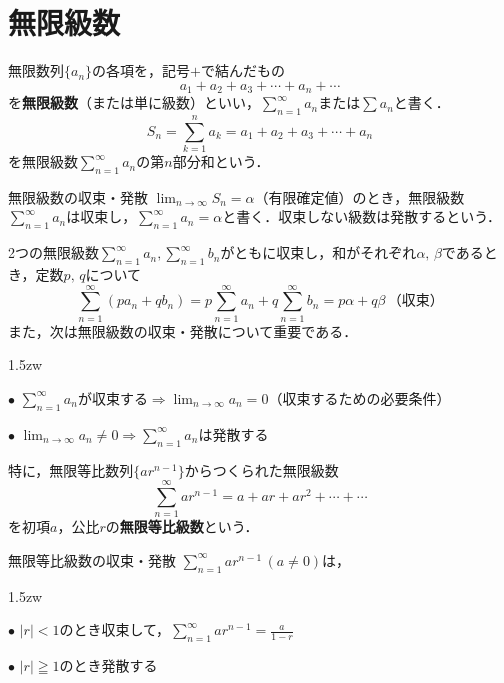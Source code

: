 \section{無限級数}
無限数列$\{a_n\}$の各項を，記号$+$で結んだもの\pagebreak[3]
\[
a_1 + a_2 + a_3 + \cdots + a_n + \cdots
\]
を\textbf{無限級数}（または単に級数）といい，$\displaystyle \sum_{n=1}^\infty a_n$または$\displaystyle \sum a_n$と書く．
\[
S_n = \sum_{k=1}^n a_k = a_1 + a_2 + a_3 + \cdots + a_n 
\]
を無限級数$\displaystyle \sum_{n=1}^\infty a_n$の第$n$部分和という．
\begin{titlebox}{無限級数の収束・発散}
$\displaystyle \lim_{n \to \infty}S_n = \alpha$（有限確定値）のとき，無限級数$\displaystyle \sum_{n=1}^\infty a_n$は収束し，$\displaystyle \sum_{n=1}^\infty a_n = \alpha$と書く．収束しない級数は発散するという．
\end{titlebox}

2つの無限級数$\displaystyle \sum_{n=1}^\infty a_n,\sum_{n=1}^\infty b_n$がともに収束し，和がそれぞれ$\alpha,\,\beta$であるとき，定数$p,\,q$について
\[
\sum_{n=1}^\infty(pa_n + qb_n) = p\sum_{n=1}^\infty{a_n} + q\sum_{n=1}^\infty{b_n} = p\alpha + q\beta\,（収束）
\]
また，次は無限級数の収束・発散について重要である．
\begin{kakomi}
\begin{Description}{1.5zw}
\item[$\bullet$]
$\displaystyle \sum_{n=1}^\infty a_n$が収束する$\Longrightarrow \displaystyle\lim_{n \to \infty}a_n = 0$（収束するための必要条件）
\item[$\bullet$]$\displaystyle\lim_{n \to \infty}a_n \neq 0 \Longrightarrow \sum_{n=1}^\infty a_n$は発散する
\end{Description}
\end{kakomi}
特に，無限等比数列$\{ar^{n-1}\}$からつくられた無限級数
\[
\displaystyle \sum_{n=1}^\infty ar^{n-1} = a + ar + ar^2 + \cdots + \cdots
\]
を初項$a$，公比$r$の\textbf{無限等比級数}という．
\begin{titlebox}{無限等比級数の収束・発散}
$\displaystyle \sum_{n=1}^\infty ar^{n-1}$\,$(a \neq 0)$は，
\begin{Description}{1.5zw}
\item[$\bullet$]
$|r|<1$のとき収束して，$\displaystyle \sum_{n=1}^\infty ar^{n-1}= \frac{a}{1-r}$
\item[$\bullet$]
$|r|\geqq 1$のとき発散する
\end{Description}
\end{titlebox}

